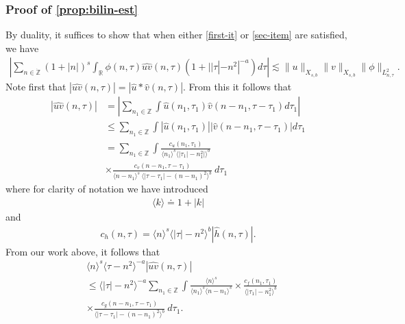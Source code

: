 \documentclass[12pt,reqno]{amsart}
\numberwithin{equation}{section}  %
\numberwithin{figure}{section}
\newcommand{\rr}{\mathbb{R}}
\newcommand{\zz}{\mathbb{Z}}
\newcommand{\zzdot}{\dot{\zz}}
\newcommand{\wh}{\widehat}
\theoremstyle{plain}
\theoremstyle{definition}
\theoremstyle{remark}
\begin{document}
\subsubsection{Proof of \autoref{prop:bilin-est}} 
\label{sssec:proof-bilin-est}
By
duality, it suffices to show that when either \eqref{first-it} or
\eqref{sec-item} are satisfied, we have
%
\begin{equation}
	\label{duality-est}
	\begin{split}
	|	\sum_{n \in \zzdot}  (1 + |n|)^{s}
		\int_{\rr} \phi(n, \tau) \wh{uv}(n, \tau)(1 
    + | |\tau| - n^{2} |^{-a}) d \tau | \lesssim \|u\|_{X_{s,b}}
    \|v\|_{X_{s,b}}
    \|\phi \|_{L^{2}_{n, \tau}}.
	\end{split}
\end{equation}
Note first that $|\wh{uv}(n, \tau) |  = | \wh{u} *  \wh{v} 
(n, \tau)|$. From this it follows that
%
%
\begin{equation}
	\label{non-lin-rep}
	\begin{split}
		| \wh{uv}(n, \tau)|
    & = | \sum_{n_{1} \in \zz }  \int
    \wh{u}\left( n_1,  \tau_1 \right) \wh{v}\left( n - n_1 , \tau - \tau_1   
\right) d \tau_1 |
\\
& \le  \sum_{n_{1} \in \zz }  \int
    |\wh{u}\left( n_1,  \tau_1 \right)| |\wh{v}\left( n - n_1 , \tau - \tau_1   
\right)| d \tau_1 
\\
& = \sum_{n_1 \in \zz } \int \frac{c_u\left( n_1, \tau_1 
\right)}{\langle n_1 \rangle ^s \langle |\tau_1| - n_1^{2} | \rangle ^{b}}
\\
& \times \frac{c_{v}\left( n - n_1, \tau - \tau_1 \right)}{\langle n -
n_1 \rangle ^s\ \langle |\tau - \tau_1 | -  (n - n_1)^{2} \rangle^{b}}
  \ d \tau_1 
\end{split}
\end{equation}
%
%
where for clarity of notation we have introduced 
%
%
%
\begin{equation*}
\begin{split}
\langle k \rangle \doteq 1 + |k|
\end{split}
\end{equation*}
%
%
and
%
\begin{equation*}
	\begin{split}
		c_h(n, \tau) =
			\langle n \rangle ^s \langle |\tau| - n^{2} \rangle ^{b} | \wh{h}\left( n, \tau \right) |.
	\end{split}
\end{equation*}
%
%
From our work above, it follows that 
%
%
\begin{equation}
	\label{convo-est-starting-pnt}
	\begin{split}
		 & \langle n \rangle^s \langle \tau - n^{2} \rangle^{-a} | \wh{uv}\left( 
		n, \tau \right) |
		\\
		& \le \langle |\tau| - n^{2} \rangle^{-a}
		\sum_{n_1 \in \zz} \int \frac{\langle n \rangle^{s}}{\langle n_1 \rangle^s
    \langle n - n_1 \rangle^s} 
		\times \frac{c_f(n_1, \tau_1)}{\langle |\tau_1| - n_1^{2} \rangle ^{b}}
		\\
		& \times
		\frac{c_g(n - n_1, \tau - \tau_1 )}{\langle |\tau - \tau_1| - (n - n_1)^{2}
    \rangle^{b}}\ d \tau_1.
	\end{split}
\end{equation}
\end{document}
